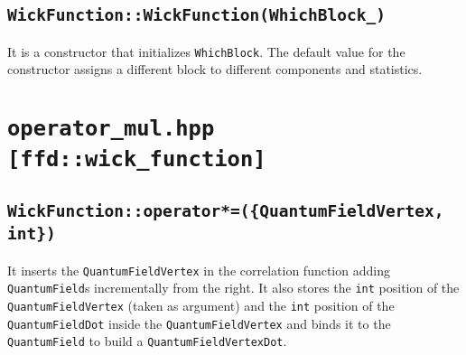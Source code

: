 \subsection{\texttt{WickFunction::WickFunction(WhichBlock\_)}}
It is a constructor that initializes \texttt{WhichBlock}. The default value for the constructor assigns a different block to different components and statistics.
\section{\texttt{operator\_mul.hpp [ffd::wick\_function]}}
\subsection{\texttt{WickFunction::operator*=(\{QuantumFieldVertex, int\})}}
It inserts the \texttt{QuantumFieldVertex} in the correlation function adding \texttt{QuantumField}s incrementally from the right. It also stores the \texttt{int} position of the \texttt{QuantumFieldVertex} (taken as argument) and the \texttt{int} position of the \texttt{QuantumFieldDot} inside the \texttt{QuantumFieldVertex} and binds it to the \texttt{QuantumField} to build a \texttt{QuantumFieldVertexDot}.







